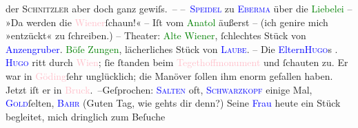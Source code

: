                der \textsc{Schnitzler} aber doch ganz gewiſs. –\pend
           \pstart
           – \textcolor{blue}{\textsc{Speidel}}{}\ledrightnote{\textcolor{blue}{Ludwig Speidel}} zu \textcolor{blue}{\textsc{Eberma{\geminationn}}}{}\ledrightnote{\textcolor{blue}{Leo Ebermann}} über die \textcolor{green}{Liebelei}{}\ledrightnote{\textcolor{green}{Liebelei. Schauspiel in drei Akten}} – »Da werden die \textcolor{pink}{Wiener}{}\ledrightnote{\textcolor{pink}{Wien}}{ }ſchaun!« – Iſt vom \textcolor{green}{Anatol}{}\ledrightnote{\textcolor{green}{Anatol}} äußerst – (ich genire mich »entzückt« zu ſchreiben.) – Theater: \textcolor{green}{Alte Wiener}{}\ledrightnote{\textcolor{green}{Alte Wiener}}, ſchlechtes Stück von \textcolor{blue}{Anzengruber}{}\ledrightnote{\textcolor{blue}{Ludwig Anzengruber}}. \textcolor{green}{Böſe Zungen}{}\ledrightnote{\textcolor{green}{Böse Zungen}},
               lächerliches Stück von \textcolor{blue}{\textsc{Laube}}{}\ledrightnote{\textcolor{blue}{Heinrich Laube}}. –\pend
           \pstart
           Die \textcolor{blue}{Eltern}{}\textcolor{blue}{\textsc{Hugo}}{}\ledrightnote{\textcolor{blue}{Hugo von Hofmannsthal}}s \label{K_L00483_2v}\label{K_L00483_2h}. \textcolor{blue}{\textsc{Hugo}}{}\ledrightnote{\textcolor{blue}{Hugo von Hofmannsthal}} ritt durch \textcolor{pink}{Wien}{}\ledrightnote{\textcolor{pink}{Wien}}; ſie ſtanden beim \textcolor{pink}{Tegethoffmonument}{}\ledrightnote{\textcolor{pink}{Tegetthoff-Denkmal}} und ſchauten zu. Er war in \textcolor{pink}{Göding}{}\ledrightnote{\textcolor{pink}{Hodonín}}{ }ſehr unglücklich; die Manöver ſollen {\pb}ihm enorm gefallen haben. Jetzt iſt er in \textcolor{pink}{Bruck}{}\ledrightnote{\textcolor{pink}{Bruck an der Mur}}. –\hspace*{1.5em}Geſprochen:
                  \textcolor{blue}{\textsc{Salten}}{}\ledrightnote{\textcolor{blue}{Felix Salten}} oft, \textcolor{blue}{\textsc{Schwarzkopf}}{}\ledrightnote{\textcolor{blue}{Gustav Schwarzkopf}} einige Mal, \textcolor{blue}{\textsc{Gold}}{}\ledrightnote{\textcolor{blue}{Alfred Gold}}{ }ſelten, \textcolor{blue}{\textsc{Bahr}}{}\ledrightnote{\textcolor{blue}{Hermann Bahr}} (Guten Tag, wie gehts dir denn?) Seine \textcolor{blue}{Frau}{} heute ein Stück begleitet, mich dringlich zum Beſuche
